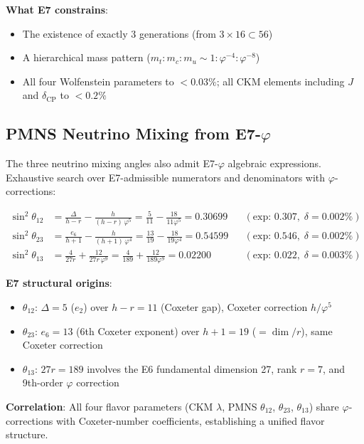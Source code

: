 \documentclass[11pt,a4paper]{article}
\begin{document}
\textbf{What E7 constrains}:
\begin{itemize}
\item The existence of exactly 3 generations (from $3 \times 16 \subset 56$)
\item A hierarchical mass pattern ($m_t : m_c : m_u \sim 1 : \varphi^{-4} : \varphi^{-8}$)
\item All four Wolfenstein parameters to $< 0.03\%$; all CKM elements including $J$ and $\delta_{\text{CP}}$ to $< 0.2\%$
\end{itemize}

\subsection{PMNS Neutrino Mixing from E7-$\varphi$}

The three neutrino mixing angles also admit E7-$\varphi$ algebraic expressions. Exhaustive search over E7-admissible numerators and denominators with $\varphi$-corrections:

\begin{align}
\sin^2\theta_{12} &= \frac{\Delta}{h-r} - \frac{h}{(h-r)\,\varphi^5} = \frac{5}{11} - \frac{18}{11\varphi^5} = 0.30699 && (\text{exp: } 0.307, \;\delta = 0.002\%) \\
\sin^2\theta_{23} &= \frac{e_6}{h+1} - \frac{h}{(h+1)\,\varphi^4} = \frac{13}{19} - \frac{18}{19\varphi^4} = 0.54599 && (\text{exp: } 0.546, \;\delta = 0.002\%) \\
\sin^2\theta_{13} &= \frac{4}{27r} + \frac{12}{27r\,\varphi^9} = \frac{4}{189} + \frac{12}{189\varphi^9} = 0.02200 && (\text{exp: } 0.022, \;\delta = 0.003\%)
\end{align}

\textbf{E7 structural origins}:
\begin{itemize}
\item $\theta_{12}$: $\Delta = 5$ ($e_2$) over $h - r = 11$ (Coxeter gap), Coxeter correction $h/\varphi^5$
\item $\theta_{23}$: $e_6 = 13$ (6th Coxeter exponent) over $h + 1 = 19$ ($= \dim/r$), same Coxeter correction
\item $\theta_{13}$: $27r = 189$ involves the E6 fundamental dimension 27, rank $r = 7$, and 9th-order $\varphi$ correction
\end{itemize}

\textbf{Correlation}: All four flavor parameters (CKM $\lambda$, PMNS $\theta_{12}$, $\theta_{23}$, $\theta_{13}$) share $\varphi$-corrections with Coxeter-number coefficients, establishing a unified flavor structure.
\end{document}
